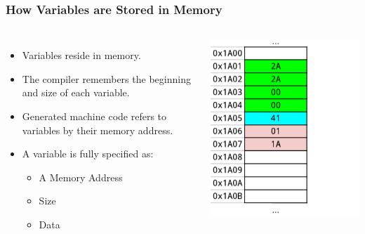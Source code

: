 \documentclass{beamer}
\begin{document}
\begin{frame}
    \frametitle{How Variables are Stored in Memory}
    \begin{columns}
        \begin{itemize}
            \item Variables reside in memory.
            \item The compiler remembers the beginning 
                and size of each variable.
            \item Generated machine code refers to variables
                by their memory address.
            \item A variable is fully specified as:
                \begin{itemize}
                    \item A Memory Address
                    \item Size
                    \item Data 
                \end{itemize}
        \end{itemize}
        \includegraphics[height=0.60\textheight]{images/memdata}
    \end{columns}
\end{frame}
\end{document}
